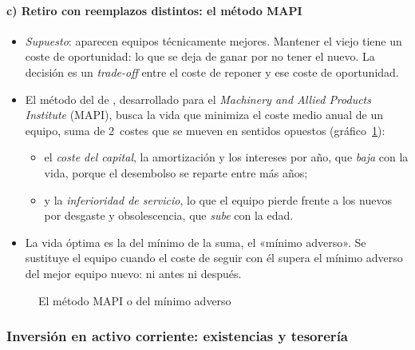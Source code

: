\documentclass[11pt]{article}
\begin{document}
\paragraph{c) Retiro con reemplazos distintos: el método MAPI}

\begin{itemize}
\item \emph{Supuesto}: aparecen equipos técnicamente mejores. Mantener el viejo tiene un coste de oportunidad: lo que se deja de ganar por no tener el nuevo. La decisión es un \emph{trade-off} entre el coste de reponer y ese coste de oportunidad.
\item El método del  de \textcite{Terborgh1949Dynamic}, desarrollado para el \emph{Machinery and Allied Products Institute} (MAPI), busca la vida que minimiza el coste medio anual de un equipo, suma de 2~costes que se mueven en sentidos opuestos (gráfico~\ref{fig:mapi}):
  \begin{itemize}
  \item el \emph{coste del capital}, la amortización y los intereses por año, que \emph{baja} con la vida, porque el desembolso se reparte entre más años;
  \item y la \emph{inferioridad de servicio}, lo que el equipo pierde frente a los nuevos por desgaste y obsolescencia, que \emph{sube} con la edad.
  \end{itemize}
\item La vida óptima es la del mínimo de la suma, el «mínimo adverso». Se sustituye el equipo cuando el coste de seguir con él supera el mínimo adverso del mejor equipo nuevo: ni antes ni después.
\end{itemize}

\begin{figure}[H]
\centering
\caption{El método MAPI o del mínimo adverso}\label{fig:mapi}
\end{figure}

\subsubsection{Inversión en activo corriente: existencias y tesorería}\label{sec:corriente}
\end{document}
